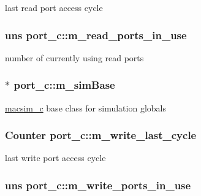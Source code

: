 \label{classport__c_acd222eb5127ef8d6766f47c8de56ccf3}
last read port access cycle \hypertarget{classport__c_ac1be920cefbf209a4cef23d32cbbc1b7}{
\subsubsection[{m\_\-read\_\-ports\_\-in\_\-use}]{\setlength{\rightskip}{0pt plus 5cm}uns {\bf port\_\-c::m\_\-read\_\-ports\_\-in\_\-use}}}
\label{classport__c_ac1be920cefbf209a4cef23d32cbbc1b7}
number of currently using read ports \hypertarget{classport__c_a2730e74a6ee249d570e02d1963d287cf}{
\subsubsection[{m\_\-simBase}]{$\ast$ {\bf port\_\-c::m\_\-simBase}}}
\label{classport__c_a2730e74a6ee249d570e02d1963d287cf}
\hyperlink{classmacsim__c}{macsim\_\-c} base class for simulation globals \hypertarget{classport__c_a74c23b29afab394edfbafac725b24fe9}{
\subsubsection[{m\_\-write\_\-last\_\-cycle}]{\setlength{\rightskip}{0pt plus 5cm}Counter {\bf port\_\-c::m\_\-write\_\-last\_\-cycle}}}
\label{classport__c_a74c23b29afab394edfbafac725b24fe9}
last write port access cycle \hypertarget{classport__c_a2f3b34b182e72b0f371651c0d433cc50}{
\subsubsection[{m\_\-write\_\-ports\_\-in\_\-use}]{\setlength{\rightskip}{0pt plus 5cm}uns {\bf port\_\-c::m\_\-write\_\-ports\_\-in\_\-use}}}
